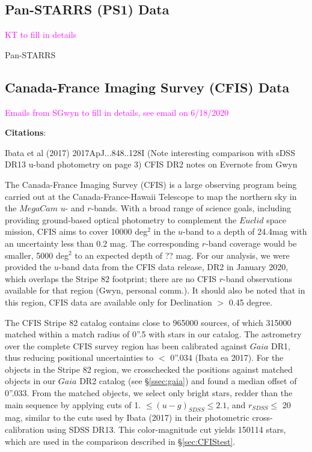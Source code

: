 \documentclass{aastex63}
\newcommand{\tbd}[1]{\textcolor{magenta}{#1}} %
\begin{document}

\subsection{Pan-STARRS (PS1) Data} \label{ssec:ps1}

\tbd{KT to fill in details}

Pan-STARRS \citep{2010SPIE.7733E..0EK}


\subsection{Canada-France Imaging Survey (CFIS) Data} \label{ssec:cfis}

\tbd{Emails from SGwyn to fill in details, see email on 6/18/2020}

{\bf Citations}: 

Ibata et al (2017) 2017ApJ...848..128I (Note interesting comparison with sDSS DR13 u-band photometry on page 3) 
CFIS DR2 notes on Evernote from Gwyn

The Canada-France Imaging Survey (CFIS) is a large observing program being carried out at the Canada-France-Hawaii Telescope to map the northern sky in the $MegaCam$ $u$- and $r$-bands. With a broad range of science goals, including providing ground-based optical photometry to complement the $Euclid$ space mission, CFIS aims to cover 10000 deg$^2$ in the $u$-band to a depth of 24.4mag with an uncertainty less than 0.2 mag. The corresponding $r$-band coverage would be smaller, 5000 deg$^2$ to an expected depth of ?? mag. For our analysis, we were provided the $u$-band data from the CFIS data release, DR2 in January 2020, which overlaps the Stripe 82 footprint; there are no CFIS $r$-band observations available for that region (Gwyn, personal comm.).  It should also be noted that in this region, CFIS data are available only for Declination $>$ 0.45 degree.

The CFIS Stripe 82 catalog contains close to 965000 sources, of which 315000 matched within a match radius of 0''.5 with stars in our catalog. The astrometry over the complete CFIS survey region has been calibrated against $Gaia$ DR1, thus reducing positional uncertainties to $<$ 0''.034 (Ibata ea 2017). For the objects in the Stripe 82 region, we crosschecked the positions against matched objects in our $Gaia$ DR2 catalog (see \S \ref{ssec:gaia}) and found a median offset of 0''.033. From the matched objects, we select only bright stars, redder than the main sequence by applying cuts of 1. $\leq (u-g)_{SDSS} \leq 2.1$, and $r_{SDSS} \leq $ 20 mag, similar to the cuts used by Ibata (2017) in their photometric cross-calibration using SDSS DR13. This color-magnitude cut yields 150114 stars, which are used in the comparison described in \S \ref{sec:CFIStest}.   
  
\end{document}
